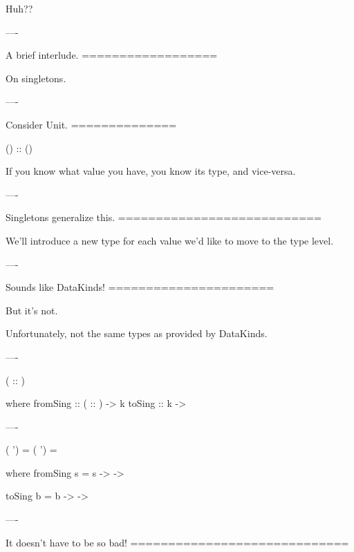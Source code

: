 Huh??

----

A brief interlude.
==================

On singletons.

----

Consider Unit.
==============

\begin{hs}
  () :: ()
\end{hs}

If you know what value you have, you know its type, and vice-versa.

----

Singletons generalize this.
===========================

We'll introduce a new type for each value we'd like to move to the type level.

----

Sounds like DataKinds!
======================

But it's not.

Unfortunately, not the same types as provided by DataKinds.

----

\begin{custom}

    ( :: )

     where
    fromSing ::  ( :: ) -> k
    toSing   :: k ->  
\end{custom}

----

\begin{custom}
   ( ')  = 
   ( ') = 


     where
    fromSing s =  s 
        -> 
       -> 

    toSing b =  b 
        -> 
       -> 
\end{custom}

----

It doesn't have to be so bad!
=============================

